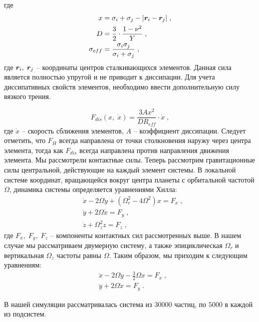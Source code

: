 где
\begin{equation}
  \begin{split}
    x &= \sigma_i + \sigma_j - \vert \bm{r}_i-\bm{r}_j\vert\;,\\
    D &= \frac{3}{2}\cdot\frac{1-\nu^2}{Y}\;,\\
    \sigma_{eff} &= \frac{\sigma_i\sigma_j}{\sigma_i+\sigma_j}\;,
  \end{split}
\end{equation}
где $\bm{r}_i,\;\bm{r}_j$ -- координаты центров сталкивающихся элементов. Данная сила является полностью упругой и не приводит к диссипации.
Для учета диссипативных свойств элементов, необходимо ввести дополнительную силу вязкого трения. 

\begin{equation}
  F_{dis}(x,\;\dot{x}) = \frac{3Ax^2}{DR_{eff}}\cdot\dot{x}\;,
\end{equation}
где $\dot{x}$ -- скорость сближения элементов, $A$ -- коэффициент диссипации. Следует отметить, что $F_H$ всегда направлена
от точки столкновения наружу через центра элемента, тогда как $F_{dis}$ всегда направлена против направления движения элемента.
Мы рассмотрели контактные силы. Теперь рассмотрим гравитационные силы центральной, действующие на каждый элемент системы. 
В локальной системе координат, вращающейся вокруг центра планеты с орбитальной частотой $\Omega$, динамика системы 
определяется уравнениями Хилла:
\begin{equation}
  \begin{split}
    &\ddot{x} - 2\Omega\dot{y}+\left(\Omega_r^2-4\Omega^2\right)x = F_x\;,\\
    &\ddot{y} + 2\Omega\dot{x} = F_y\;,\\
    &\ddot{z} + \Omega_z^2z = F_z\;,
  \end{split}
\end{equation}
где $F_x,\;F_y,\;F_z$ -- компоненты контактных сил рассмотренных выше. В нашем случае мы рассматриваем двумерную систему, а также 
эпициклическая $\Omega_r$ и вертикальная $\Omega_z$ частоты равны $\Omega$. Таким образом, мы приходим к следующим уравнениям:
\begin{equation}
  \begin{split}
    &\ddot{x}-2\Omega\dot{y}-\frac{3}{2}\Omega x = F_x\;,\\
    &\ddot{y}+2\Omega\dot{x} = F_y\;. 
  \end{split}
\end{equation}

В нашей симуляции рассматривалась система из $30000$ частиц, по $5000$ в каждой из подсистем.
